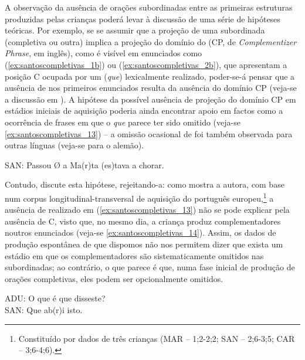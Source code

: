 \documentclass[output=paper]{LSP/langsci}
\begin{document}
A observação da ausência de orações subordinadas entre as primeiras estruturas produzidas pelas crianças poderá levar à discussão de uma série de hipóteses teóricas. Por exemplo, se se assumir que a projeção de uma subordinada (completiva ou outra) implica a projeção do domínio do  (CP, de \textit{Complementizer Phrase}, em inglês), como é visível em enunciados como (\ref{ex:santoscompletivas_1b}) ou (\ref{ex:santoscompletivas_2b}), que apresentam a posição C ocupada por um  (\textit{que}) lexicalmente realizado, poder-se-á pensar que a ausência de  nos primeiros enunciados resulta da ausência do domínio CP (veja-se a discussão em \citet{meiselmuller1992,radford1996}). A hipótese da possível ausência de projeção do domínio CP em estádios iniciais de aquisição poderia ainda encontrar apoio em factos como a ocorrência de frases em que o  \textit{que} parece ter sido omitido (veja-se \ref{ex:santoscompletivas_13}) – a omissão ocasional de  foi também observada para outras línguas (veja-se \citealt{meiselmuller1992} para o alemão).

\ea\label{ex:santoscompletivas_13}
SAN: Passou Ø a Ma(r)ta (es)tava a chorar.\\
\z

Contudo, \citet{soares2006} discute esta hipótese, rejeitando-a: como mostra a autora, com base num corpus longitudinal-transversal de aquisição do português europeu,\footnote{Constituído por dados de três crianças (MAR – 1;2-2;2; SAN – 2;6-3;5; CAR – 3;6-4;6).} a ausência de  realizado em (\ref{ex:santoscompletivas_13}) não se pode explicar pela ausência de C, visto que, no mesmo dia, a criança produz complementadores noutros enunciados (veja-se \ref{ex:santoscompletivas_14}). Assim, os dados de produção espontânea de que dispomos não nos permitem dizer que exista um estádio em que os complementadores são sistematicamente omitidos nas subordinadas; ao contrário, o que parece é que, numa fase inicial de produção de orações completivas, eles podem ser opcionalmente omitidos.

\ea\label{ex:santoscompletivas_14}
ADU: O que é que disseste?\\
SAN: Que ab(r)i isto.
\z
\end{document}
